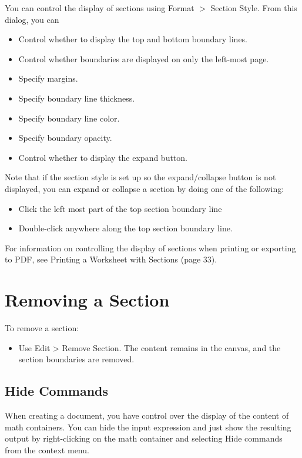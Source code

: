 You can control the display of sections using Format $>$ Section Style. From this dialog, you can

\begin{itemize}
  \item Control whether to display the top and bottom boundary lines.

  \item Control whether boundaries are displayed on only the left-most page.

  \item Specify margins.

  \item Specify boundary line thickness.

  \item Specify boundary line color.

  \item Specify boundary opacity.

  \item Control whether to display the expand button.

\end{itemize}

Note that if the section style is set up so the expand/collapse button is not displayed, you can expand or collapse a section by doing one of the following:

\begin{itemize}
  \item Click the left most part of the top section boundary line

  \item Double-click anywhere along the top section boundary line.

\end{itemize}

For information on controlling the display of sections when printing or exporting to PDF, see Printing a Worksheet with Sections (page 33).

\section{Removing a Section}
To remove a section:

\begin{itemize}
  \item Use Edit > Remove Section. The content remains in the canvas, and the section boundaries are removed.
\end{itemize}

\subsection{Hide Commands}
When creating a document, you have control over the display of the content of math containers. You can hide the input expression and just show the resulting output by right-clicking on the math container and selecting Hide commands from the context menu.

